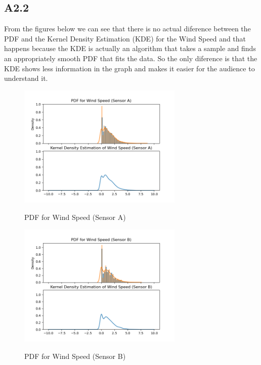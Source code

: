 \documentclass[a4paper,12pt]{article}
\begin{document}
 \subsection{A2.2}
 From the figures below we can see that there is no actual diference between the PDF and the Kernel Density Estimation (KDE) for the Wind Speed and that happens because the KDE is actually an algorithm that takes a sample
 and finds an appropriately smooth PDF that fits the data. So the only diference is that the KDE shows less information in the graph and makes it easier for the audience to understand it.
  \begin{figure}[H] 
	\centering
	\includegraphics[width=0.7\textwidth]{PDF for Wind Speed (Sensor A).png}
	\caption{PDF for Wind Speed (Sensor A)}\cite{Maiullari2020}
  \end{figure}
  \begin{figure}[H] 
	\centering
	\includegraphics[width=0.7\textwidth]{PDF for Wind Speed (Sensor B).png}
	\caption{PDF for Wind Speed (Sensor B)}\cite{Maiullari2020}
  \end{figure}
\end{document}
